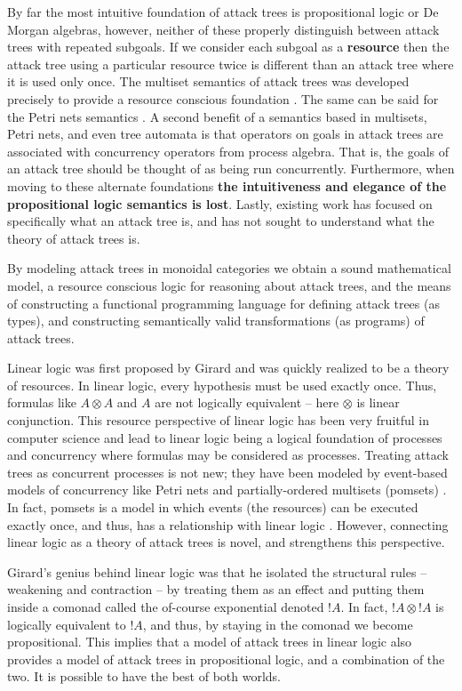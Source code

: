 \documentclass{sigplanconf}
\begin{document}
By far the most intuitive foundation of attack trees is propositional
logic or De Morgan algebras, however, neither of these properly
distinguish between attack trees with repeated subgoals.  If we
consider each subgoal as a \textbf{resource} then the attack tree
using a particular resource twice is different than an attack tree
where it is used only once.  The multiset semantics of attack trees
was developed precisely to provide a resource conscious foundation
\cite{Mauw:2006}. The same can be said for the Petri nets semantics
\cite{McDermott:2001}.  A second benefit of a semantics based in
multisets, Petri nets, and even tree automata is that operators on
goals in attack trees are associated with concurrency operators from
process algebra.  That is, the goals of an attack tree should be
thought of as being run concurrently.  Furthermore, when moving to
these alternate foundations \textbf{the intuitiveness and elegance of
  the propositional logic semantics is lost}.  Lastly, existing work
has focused on specifically what an attack tree is, and has not sought
to understand what the theory of attack trees is.

By modeling attack trees in monoidal categories we obtain a sound
mathematical model, a resource conscious logic for reasoning about
attack trees, and the means of constructing a functional programming
language for defining attack trees (as types), and constructing
semantically valid transformations (as programs) of attack trees.

Linear logic was first proposed by Girard \cite{Girard:1987} and was
quickly realized to be a theory of resources.  In linear logic, every
hypothesis must be used exactly once.  Thus, formulas like $A \otimes
A$ and $A$ are not logically equivalent -- here $\otimes$ is linear
conjunction.  This resource perspective of linear logic has been very
fruitful in computer science and lead to linear logic being a logical
foundation of processes and concurrency where formulas may be
considered as processes.  Treating attack trees as concurrent
processes is not new; they have been modeled by event-based models of
concurrency like Petri nets and partially-ordered multisets (pomsets)
\cite{Jhawar:2015,Mauw:2006}.  In fact, pomsets is a model in which
events (the resources) can be executed exactly once, and thus, has a
relationship with linear logic \cite{Retore:1997}.  However,
connecting linear logic as a theory of attack trees is novel, and
strengthens this perspective.

Girard's genius behind linear logic was that he isolated the
structural rules -- weakening and contraction -- by treating them as
an effect and putting them inside a comonad called the of-course
exponential denoted $!A$.  In fact, $!A \otimes !A$ is logically
equivalent to $!A$, and thus, by staying in the comonad we become
propositional.  This implies that a model of attack trees in linear
logic also provides a model of attack trees in propositional logic,
and a combination of the two.  It is possible to have the best of both
worlds.
\end{document}
